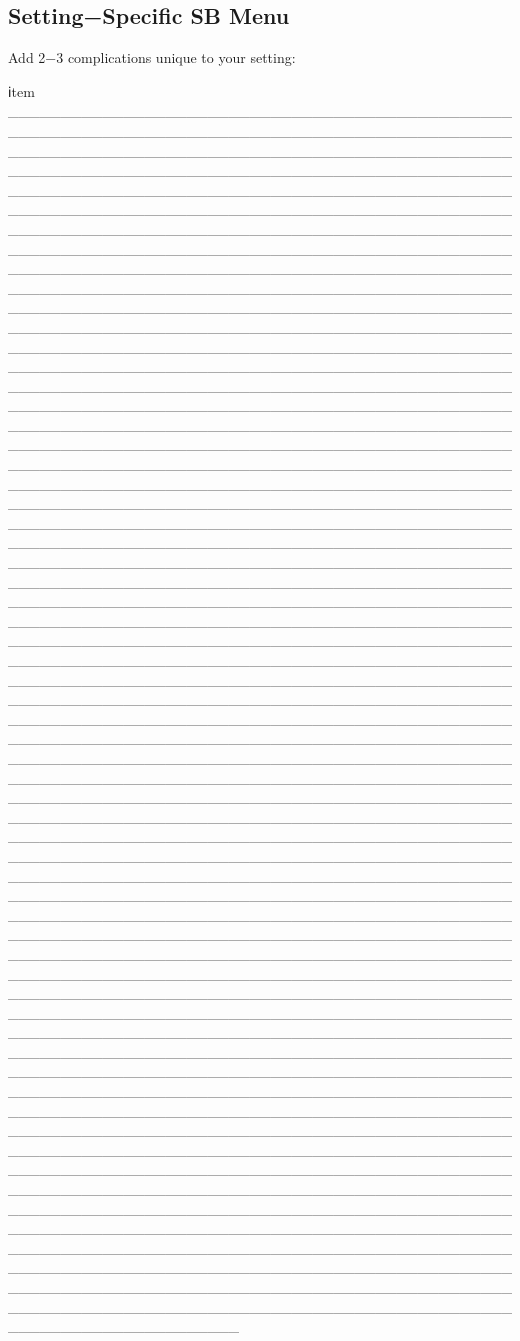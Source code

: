 \subsection*{Setting−Specific SB Menu}
Add 2−3 complications unique to your setting:
\begin{itemize}
    ℹtem ______________________________________________________________________________________________________________________________________________________________________________________________________________________________________________________________________________________________________________________________________________________________________________________________________________________________________________________________________________________________________________________________________________________________________________________________________________________________________________________________________________________________________________________________________________________________________________________________________________________________________________________________________________________________________________________________________________________________________________________________________________________________________________________________________________________________________________________________________________________________________________________________________________________________________________________________________________________________________________________________________________________________________________________________________________________________________________________________________________________________________________________________________________________________________________________________________________________________________________________________________________________________________________________________________________________________________________________________________________________________________________________________________________________________________________________________________________________________________________________________________________________________________________________________________________________________________________________________________________________________________________________________________________________________________________________________________________________________________________________________________________________________________________________________________________________________________________________________________________________________________________________________________________________________________________________________________________________________________________________________________________________________________________________________________________________________________________________________________________________________________________________________________________________________________________________________________________________________________________________________________________________________________________________________________________________________________________________
\end{itemize}
